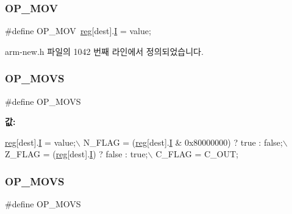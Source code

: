 \subsubsection{\texorpdfstring{O\+P\+\_\+\+M\+OV}{OP\_MOV}\hspace{0.1cm}{\footnotesize\ttfamily [2/2]}}
{\footnotesize\ttfamily \#define O\+P\+\_\+\+M\+OV~\mbox{\hyperlink{_globals_8h_ae29faba89509024ffd1a292badcedf2d}{reg}}\mbox{[}dest\mbox{]}.\mbox{\hyperlink{thumb_8h_a782b7c7c9a56a2031f6270eac7f000d6}{I}} = value;}



arm-\/new.\+h 파일의 1042 번째 라인에서 정의되었습니다.

\mbox{\label{_g_b_a_8cpp_a349e8ba1c82ebd2e652e8421b7d6fa32}} 
\subsubsection{\texorpdfstring{O\+P\+\_\+\+M\+O\+VS}{OP\_MOVS}\hspace{0.1cm}{\footnotesize\ttfamily [1/2]}}
{\footnotesize\ttfamily \#define O\+P\+\_\+\+M\+O\+VS}

{\bfseries 값\+:}
\begin{DoxyCode}
\mbox{\hyperlink{_g_b_a_8h_ae29faba89509024ffd1a292badcedf2d}{reg}}[dest].\mbox{\hyperlink{unionreg__pair_a9f6a42d56c07829d7013571eda998252}{I}} = value;\(\backslash\)
    N\_FLAG = (\mbox{\hyperlink{_g_b_a_8h_ae29faba89509024ffd1a292badcedf2d}{reg}}[dest].\mbox{\hyperlink{unionreg__pair_a9f6a42d56c07829d7013571eda998252}{I}} & 0x80000000) ? \textcolor{keyword}{true} : \textcolor{keyword}{false};\(\backslash\)
    Z\_FLAG = (\mbox{\hyperlink{_g_b_a_8h_ae29faba89509024ffd1a292badcedf2d}{reg}}[dest].\mbox{\hyperlink{unionreg__pair_a9f6a42d56c07829d7013571eda998252}{I}}) ? \textcolor{keyword}{false} : \textcolor{keyword}{true};\(\backslash\)
    C\_FLAG = C\_OUT;
\end{DoxyCode}
\mbox{\label{arm-new_8h_a349e8ba1c82ebd2e652e8421b7d6fa32}} 
\subsubsection{\texorpdfstring{O\+P\+\_\+\+M\+O\+VS}{OP\_MOVS}\hspace{0.1cm}{\footnotesize\ttfamily [2/2]}}
{\footnotesize\ttfamily \#define O\+P\+\_\+\+M\+O\+VS}

